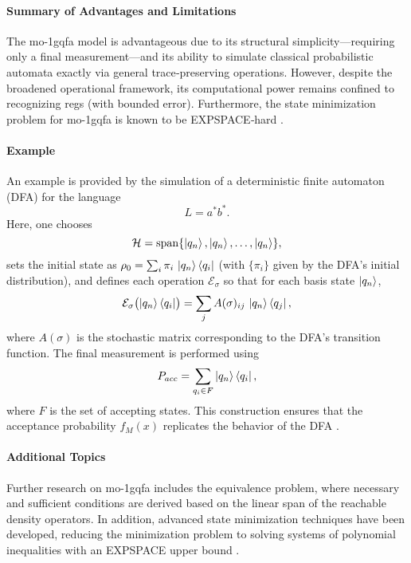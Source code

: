 \paragraph{Summary of Advantages and Limitations}  
The \gls{mo-1gqfa} model is advantageous due to its structural simplicity—requiring only a final measurement—and its ability to simulate classical probabilistic automata exactly via general trace‐preserving operations. However, despite the broadened operational framework, its computational power remains confined to recognizing \glspl{reg} (with bounded error). Furthermore, the state minimization problem for \gls{mo-1gqfa} is known to be EXPSPACE‐hard \cite{mateus2012complexity}.

\paragraph{Example}  
An example is provided by the simulation of a deterministic finite automaton (DFA) for the language
\[
L=a^*b^*.
\]
Here, one chooses 
\[
\mathcal{H}=\mathrm{span}\{\ket{q_n},\ket{q_n},\dots,\ket{q_n}\},
\]
sets the initial state as $\rho_0=\sum_{i}\pi_i\,\ket{q_n}\bra{q_i}$ (with $\{\pi_i\}$ given by the DFA's initial distribution), and defines each operation $\mathcal{E}_\sigma$ so that for each basis state $\ket{q_n}$,
\[
\mathcal{E}_\sigma\bigl(\ket{q_n}\bra{q_i}\bigr)=\sum_{j}A(\sigma)_{ij}\,\ket{q_n}\bra{q_j},
\]
where $A(\sigma)$ is the stochastic matrix corresponding to the DFA's transition function. The final measurement is performed using 
\[
P_{acc}=\sum_{q_i\in F}\ket{q_n}\bra{q_i},
\]
where $F$ is the set of accepting states. This construction ensures that the acceptance probability $f_M(x)$ replicates the behavior of the DFA \cite{li2012characterizations}.

\paragraph{Additional Topics}  
Further research on \gls{mo-1gqfa} includes the equivalence problem, where necessary and sufficient conditions are derived based on the linear span of the reachable density operators. In addition, advanced state minimization techniques have been developed, reducing the minimization problem to solving systems of polynomial inequalities with an EXPSPACE upper bound \cite{mercer2008lower}.

\subsubsection{}
